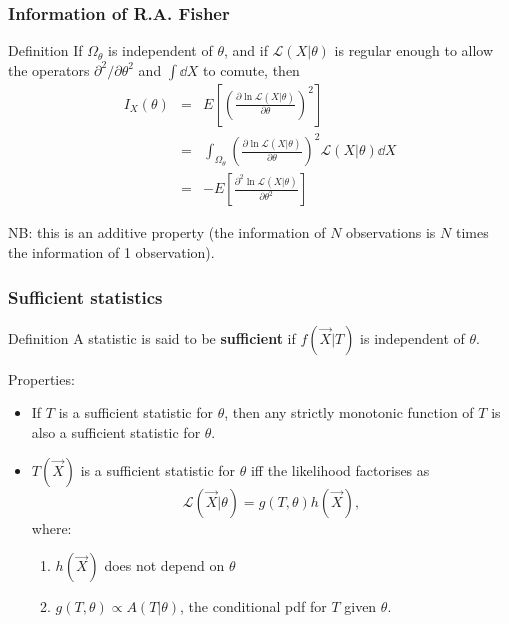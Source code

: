 \documentclass[9pt]{beamer}
\newif\ifmyhide
\newcommand\myhide[1]{%
\ifmyhide \vspace{15pt} \begin{center} \myexample{(blackboard)}\end{center} \vspace{15pt} \else #1 \fi
}
\begin{document}
\begin{frame}
 \frametitle{Information of R.A. Fisher}
 
 \begin{block}{Definition}
 \myhide{If $\Omega_\theta$ is independent of $\theta$, and if $\mathcal{L}(X|\theta)$ is regular enough to allow the operators $\partial^2/\partial\theta^2$ and $\int \dd X$ to comute, then
  \begin{eqnarray}
   I_X(\theta) & = & E \left[ \left( \frac{\partial \ln \mathcal{L}(X|\theta)}{\partial \theta} \right)^2 \right] \nonumber \\
   & = & \int_{\Omega_\theta} \left( \frac{\partial \ln \mathcal{L}(X|\theta)}{\partial \theta} \right)^2 \mathcal{L}(X|\theta) \dd X \nonumber \\
   & = & - E \left[ \frac{\partial^2 \ln \mathcal{L}(X|\theta)}{\partial \theta^2}  \right] \nonumber
  \end{eqnarray}
}
 \end{block}
 
 NB: this is an additive property (the information of $N$ observations is $N$ times the information of 1 observation).

\end{frame}


\begin{frame}
 \frametitle{Sufficient statistics}
 
 \begin{block}{Definition}
  A statistic is said to be \textbf{sufficient} if $f(\vec{X}|T)$ is independent of $\theta$.
 \end{block}
 
 Properties:
 
 \begin{itemize}
  \item<2-> If $T$ is a sufficient statistic for $\theta$, then any strictly monotonic function of $T$ is also a sufficient statistic for $\theta$.
  \item<3> $T(\vec{X})$ is a sufficient statistic for $\theta$ iff the likelihood factorises as
  $$\mathcal{L}(\vec{X}|\theta) = g(T,\theta) h(\vec{X}),$$
  where:
  \begin{enumerate}
   \item $h(\vec{X})$ does not depend on $\theta$
   \item $g(T,\theta) \propto A(T|\theta)$, the conditional pdf for $T$ given $\theta$.
  \end{enumerate}
 \end{itemize}


\end{frame}
\end{document}
